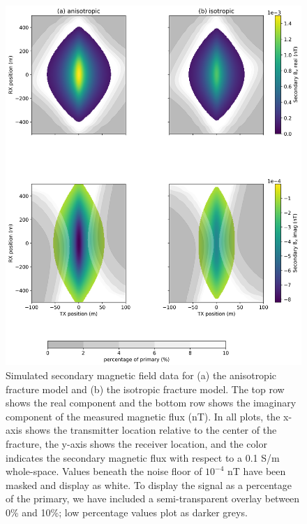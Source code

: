 \begin{figure}
    \begin{center}
    \includegraphics[width=\textwidth]{figures/phys_prop_model/crosswell_data.png}
    \end{center}
\caption{
    Simulated secondary magnetic field data for (a) the anisotropic fracture model and
    (b) the isotropic fracture model. The top row shows the real component and the bottom row shows
    the imaginary component of the measured magnetic flux (nT).
    In all plots, the x-axis shows the transmitter location relative to the center
    of the fracture, the y-axis shows the receiver location, and the color indicates the secondary
    magnetic flux with respect to a 0.1 S/m whole-space. Values beneath the noise floor of $10^{-4}$ nT
    have been masked and display as white. To display the signal as a percentage of the primary, we have
    included a semi-transparent overlay between 0\% and 10\%; low percentage values plot as darker
    greys.
}
\label{fig:crosswell_data}
\end{figure}

